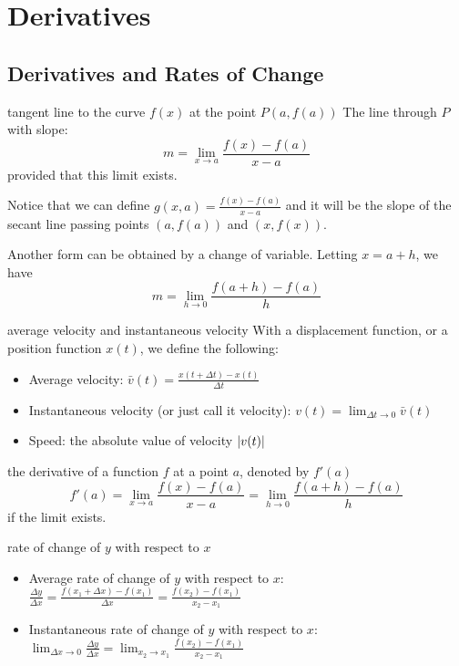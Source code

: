\documentclass[Calculus 1 Recitation.tex]{subfiles}
\begin{document}
\section{Derivatives}
\subsection{Derivatives and Rates of Change}
\begin{myleftlinebox}
	tangent line to the curve $f(x)$ at the point $P(a,f(a))$
	\tcblower
	The line through $P$ with slope:
	\[m=\lim_{x\to a} \frac{f(x)-f(a)}{x-a}\]
	provided that this limit exists. 
	
	Notice that we can define $g(x,a)=\frac{f(x)-f(a)}{x-a}$ and it will be the slope of the secant line passing points $(a,f(a))$ and $(x,f(x))$.

	Another form can be obtained by a change of variable. Letting $x=a+h$, we have
	\[m=\lim_{h\to 0}\frac{f(a+h)-f(a)}{h}\]
\end{myleftlinebox}

\begin{myleftlinebox}
	average velocity and instantaneous velocity
	\tcblower
	With a displacement function, or a position function $x(t)$, we define the following:
	\begin{itemize}
		\item Average velocity:
		\(\bar v(t)=\frac{x(t+\Delta t)-x(t)}{\Delta t}\)
		\item Instantaneous velocity (or just call it velocity):
		\(\displaystyle v(t)=\lim_{\Delta t\to 0}\bar v(t)\)
		\item Speed: the absolute value of velocity $\left\vert v(t)\right\vert$
	\end{itemize}	
\end{myleftlinebox}

\begin{myleftlinebox}
	the derivative of a function $f$ at a point $a$, denoted by $f'(a)$
	\tcblower
	\[f'(a)=\lim_{x\to a} \frac{f(x)-f(a)}{x-a}=\lim_{h\to 0}\frac{f(a+h)-f(a)}{h}\]
	if the limit exists.
\end{myleftlinebox}

\begin{myleftlinebox}
	rate of change of $y$ with respect to $x$
	\tcblower
	\begin{itemize}
		\item Average rate of change of $y$ with respect to $x$:
		\(\frac{\Delta y}{\Delta x}=\frac{f(x_1+\Delta x)-f(x_1)}{\Delta x}=\frac{f(x_2)-f(x_1)}{x_2-x_1}\)
		\item Instantaneous rate of change of $y$ with respect to $x$: 
		\(\displaystyle \lim_{\Delta x\to 0}\frac{\Delta y}{\Delta x}=\lim_{x_2\to x_1}\frac{f(x_2)-f(x_1)}{x_2-x_1}\)
	\end{itemize}	
\end{myleftlinebox}
\end{document}
